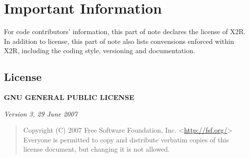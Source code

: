 \documentclass[letterpaper,10pt,english]{sphinxmanual}
\begin{document}
\chapter{Important Information}
\label{index:important-information}
For code contributors' information, this part of note declares the license of X2R. In addition to license, this part of note also lists convensions enforced within X2R, including the coding style, versioning and documentation.


\section{License}
\label{docs/license::doc}\label{docs/license:license}\label{docs/license:id1}
\textbf{GNU GENERAL PUBLIC LICENSE}

\emph{Version 3, 29 June 2007}
\begin{quote}

Copyright (C) 2007 Free Software Foundation, Inc. \textless{}\href{http://fsf.org/}{http://fsf.org/}\textgreater{}
Everyone is permitted to copy and distribute verbatim copies
of this license document, but changing it is not allowed.
\end{quote}
\end{document}
